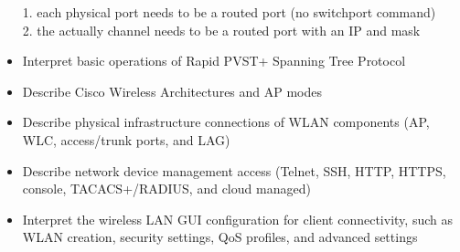 \documentclass{article}
\begin{document}
\begin{itemize}
		1. each physical port needs to be a routed port (no switchport command)\\
		2. the actually channel needs to be a routed port with an IP and mask\\
  \item Interpret basic operations of Rapid PVST+ Spanning Tree Protocol
  \item Describe Cisco Wireless Architectures and AP modes
  \item Describe physical infrastructure connections of WLAN components (AP, WLC, access/trunk ports, and LAG)
  \item Describe network device management access (Telnet, SSH, HTTP, HTTPS, console, TACACS+/RADIUS, and cloud managed)
  \item Interpret the wireless LAN GUI configuration for client connectivity, such as WLAN creation, security settings, QoS profiles, and advanced settings\\
\end{itemize}
\end{document}
